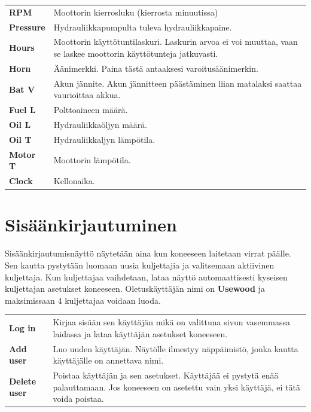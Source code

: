 \documentclass[12pt,a4paper,finnish]{uvmanual}
\begin{document}

\begin{tabular}{ L{0.2\textwidth} L{0.66\textwidth} }
\textbf{RPM} & Moottorin kierrosluku (kierrosta minuutissa) \\
\textbf{Pressure} & Hydrauliikkapumpulta tuleva hydrauliikkapaine. \\
\textbf{Hours} & Moottorin käyttötuntilaskuri. Laskurin arvoa ei voi muuttaa, vaan se laskee moottorin käyttötunteja jatkuvasti. \\
\textbf{Horn} & Äänimerkki. Paina tästä antaaksesi varoitusäänimerkin. \\
\textbf{Bat V} & Akun jännite. Akun jännitteen päästäminen liian matalaksi saattaa vaurioittaa akkua. \\
\textbf{Fuel L} & Polttoaineen määrä. \\
\textbf{Oil L} & Hydrauliikkaöljyn määrä. \\
\textbf{Oil T} & Hydrauliikkaljyn lämpötila. \\
\textbf{Motor T} & Moottorin lämpötila. \\
\textbf{Clock} & Kellonaika. \\
\end{tabular}


\chapter{Sisäänkirjautuminen}\label{ch:login}

Sisäänkirjautumisnäyttö näytetään aina kun koneeseen laitetaan virrat päälle. Sen kautta pystytään luomaan uusia kuljettajia ja valitsemaan aktiivinen kuljettaja. Kun kuljettajaa vaihdetaan, lataa näyttö automaattisesti kyseisen kuljettajan asetukset koneeseen. Oletuskäyttäjän nimi on \textbf{Usewood} ja maksimissaan 4 kuljettajaa voidaan luoda.


\begin{tabular}{ L{0.2\textwidth} L{0.66\textwidth} }
\textbf{Log in} & Kirjaa sisään sen käyttäjän mikä on valittuna sivun vasemmassa laidassa ja lataa käyttäjän asetukset koneeseen. \\
\textbf{Add user} & Luo uuden käyttäjän. Näytölle ilmestyy näppäimistö, jonka kautta käyttäjälle on annettava nimi. \\
\textbf{Delete user} & Poistaa käyttäjän ja sen asetukset. Käyttäjää ei pystytä enää palauttamaan. Jos koneeseen on asetettu vain yksi käyttäjä, ei tätä voida poistaa. \\
\end{tabular}
\end{document}

